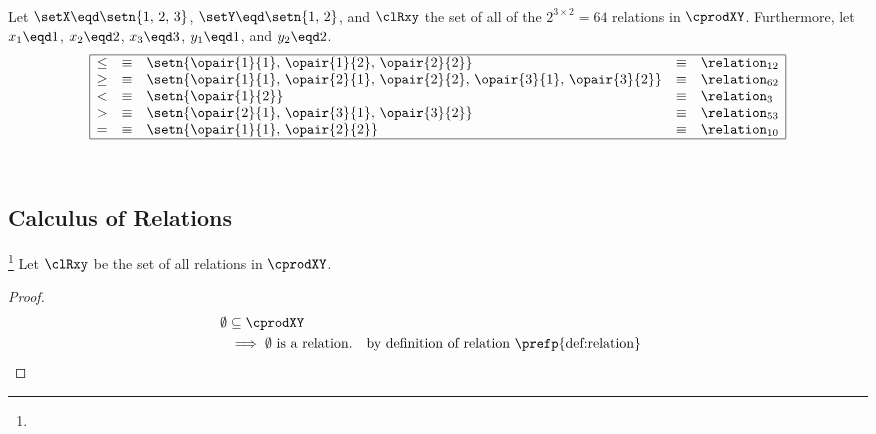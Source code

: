 \begin{example}
\label{ex:rel_123_12_common}
\hspace{1pt}\\
\begin{minipage}{10\tw/16-3mm}%
  Let $\setX\eqd\setn{1,\,2,\,3}$, $\setY\eqd\setn{1,\,2}$, 
  and $\clRxy$ the set of all of the $2^{3\times2}=64$ relations in $\cprodXY$.
  Furthermore, let $x_1\eqd1$, $x_2\eqd2$, $x_3\eqd3$, $y_1\eqd1$, and $y_2\eqd2$.
  \[\begin{array}{|cclcl|}
    \hline
    \leq &\equiv& \setn{\opair{1}{1},\,\opair{1}{2},\,\opair{2}{2}}   &\equiv& \relation_{12} \\
    \geq &\equiv& \setn{\opair{1}{1},\,\opair{2}{1},\,\opair{2}{2},\, \opair{3}{1},\,\opair{3}{2}}   &\equiv& \relation_{62} \\
    <    &\equiv& \setn{\opair{1}{2}}   &\equiv& \relation_{3} \\
    >    &\equiv& \setn{\opair{2}{1},\, \opair{3}{1},\,\opair{3}{2}}   &\equiv& \relation_{53} \\
    =    &\equiv& \setn{\opair{1}{1},\, \opair{2}{2}}   &\equiv& \relation_{10}\\
    \hline
  \end{array}\]
\end{minipage}%
\hfill{}\hfill\mbox{}\\%
\end{example}

\subsection{Calculus of Relations}
\begin{proposition}
\footnote{
  }
\label{prop:rel_emptyset}
Let $\clRxy$ be the set of all relations in $\cprodXY$.
\end{proposition}
\begin{proof}
\begin{align*}
  \emptyset
    &\subseteq \cprodXY
  \\&\implies \text{$\emptyset$ is a relation.}
    && \text{by definition of relation \prefp{def:relation}}
\end{align*}
\end{proof}

